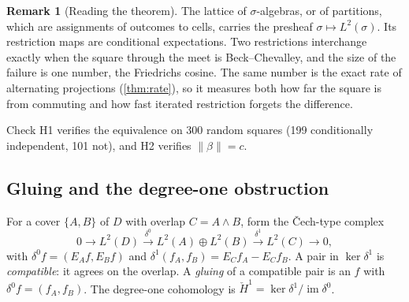 \documentclass[11pt]{article}
\theoremstyle{definition}
\newtheorem{remark}[theorem]{Remark}
\begin{document}
\begin{remark}[Reading the theorem]
The lattice of $\sigma$-algebras, or of partitions, which are assignments of outcomes to cells, carries the presheaf
$\sigma\mapsto L^2(\sigma)$. Its restriction maps are conditional expectations. Two restrictions interchange exactly when the square
through the meet is Beck--Chevalley, and the size of the failure is one number, the Friedrichs cosine. The same number is the exact rate
of alternating projections (\cref{thm:rate}), so it measures both how far the square is from commuting and how fast iterated
restriction forgets the difference.
\end{remark}

Check H1 verifies the equivalence on 300 random squares (199 conditionally independent, 101 not), and H2 verifies
$\lVert\beta\rVert=c$.

\subsection{Gluing and the degree-one obstruction}
For a cover $\{A,B\}$ of $D$ with overlap $C=A\wedge B$, form the Čech-type complex
\[
0\to L^2(D)\xrightarrow{\ \delta^0\ }L^2(A)\oplus L^2(B)\xrightarrow{\ \delta^1\ }L^2(C)\to0,
\]
with $\delta^0f=(E_Af,E_Bf)$ and $\delta^1(f_A,f_B)=E_Cf_A-E_Cf_B$.
A pair in $\ker\delta^1$ is \emph{compatible}: it agrees on the overlap. A \emph{gluing} of a compatible pair is an $f$ with
$\delta^0f=(f_A,f_B)$. The degree-one cohomology is $\check H^1=\ker\delta^1/\operatorname{im}\delta^0$.
\end{document}
